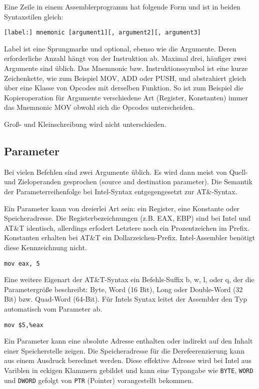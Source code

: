 Eine Zeile in einem Assemblerprogramm hat folgende Form und ist in beiden
Syntaxstilen gleich:

\texttt{[label:] mnemonic [argument1][, argument2][, argument3]}

Label ist eine Sprungmarke und optional, ebenso wie die Argumente. Deren
erforderliche Anzahl hängt von der Instruktion ab. Maximal drei, häufiger zwei
Argumente sind üblich. Das Mnemnonic bzw. Instruktionssymbol ist eine kurze
Zeichenkette, wie zum Beispiel MOV, ADD oder PUSH, und abstrahiert gleich über
eine Klasse von Opcodes mit derselben Funktion.\cite{intelmanual} So ist zum
Beispiel die Kopieroperation für Argumente verschiedene Art (Register,
Konstanten) immer das Mnemnonic MOV obwohl sich die Opcodes unterscheiden.

Groß- und Kleinschreibung wird nicht unterschieden.

\subsection{Parameter}

Bei vielen Befehlen sind zwei Argumente üblich. Es wird dann meist von Quell-
und Zieloperanden gesprochen (source and destination parameter). Die Semantik
der Parameterreihenfolge bei Intel-Syntax entgegengesetzt zur AT\&-Syntax.

Ein Parameter kann von dreierlei Art sein: ein Register, eine Konstante oder
Speicheradresse. Die Registerbezeichnungen (z.B. EAX, EBP) sind bei Intel und
AT\&T identisch, allerdings erfodert Letztere noch ein Prozentzeichen im
Prefix. Konstanten erhalten bei AT\&T ein Dollarzeichen-Prefix. Intel-Assembler
benötigt diese Kennzeichnung nicht.

\hspace{5mm} 
\texttt{mov eax, 5}

Eine weitere Eigenart der AT\&T-Syntax ein Befehls-Suffix b, w, l, oder q, der
die Parametergröße beschreibt: Byte, Word (16 Bit), Long oder Double-Word  (32
Bit) bzw.  Quad-Word (64-Bit). Für Intels Syntax leitet der Assembler den Typ
automatisch vom Parameter ab.

\hspace{5mm} 
\texttt{mov \$5,\%eax}

Ein Parameter kann eine absolute Adresse enthalten oder indirekt auf den Inhalt
einer Speicherstelle zeigen. Die Speicheradresse für die Derefeerenzierung kann
aus einem Ausdruck berechnet werden.  Diese effektive Adresse wird bei Intel
aus Variblen in eckigen Klammern gebildet und kann eine Typangabe wie
\texttt{BYTE},  \texttt{WORD} und \texttt{DWORD} gefolgt von  \texttt{PTR}
(Pointer) vorangestellt bekommen.

